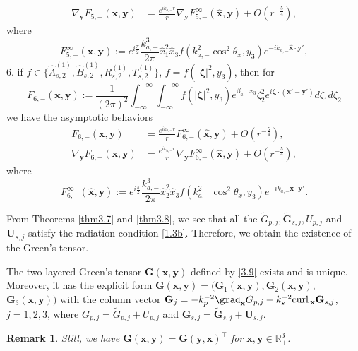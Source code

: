 \documentclass[final,reqno]{siamltex}
\newcommand{\curl}{{\rm curl\,}}
\newcommand{\wid}{\widetilde}
\newcommand{\mat}{\mathbb}
\newcommand{\R}{{\mat R}}
\newtheorem{remark}[theorem]{Remark}
\begin{document}
\begin{theorem}
\begin{align*}
	\nabla_{\mathbf{y}}F_{5,-}(\mathbf{x},\mathbf{y})&=\frac{e^{ik_{a,-}r}}{r}\nabla_{\mathbf{y}}F_{5,-}^\infty(\hat{\mathbf{x}},\mathbf{y})+O(r^{-\frac{5}{4}}), 
	\end{align*}
	where 
	$$
	F_{5,-}^\infty(\hat{\mathbf{x}},\mathbf{y}):=e^{i\frac{\pi}{2}}\frac{k_{a,-}^3}{2\pi}\hat x_1^2\hat x_3f(k_{a,-}^2\cos^2\theta_x,y_3)e^{-ik_{a,-}\hat{\mathbf{x}}\cdot\mathbf{y}'}, 
	$$
	6. if $f\in\{\hat A_{s,2}^{(1)},\hat B_{s,2}^{(1)},R_{s,2}^{(1)},T_{s,2}^{(1)}\}$, $f=f(|\boldsymbol{\zeta}|^2,y_3)$, then for 
	$$
	F_{6,-}(\mathbf{x},\mathbf{y}):=\frac{1}{(2\pi)^2}\int_{-\infty}^{+\infty}\int_{-\infty}^{+\infty}f(|\boldsymbol{\zeta}|^2,y_3)e^{\beta_{a,-}x_3}\zeta_2^2e^{i\boldsymbol{\zeta}\cdot(\mathbf{x}'-\mathbf{y}')}d\zeta_1d\zeta_2
	$$
	we have the asymptotic behaviors 
	\begin{align*}
	F_{6,-}(\mathbf{x},\mathbf{y})&=\frac{e^{ik_{a,-}r}}{r}F_{6,-}^\infty(\hat{\mathbf{x}},\mathbf{y})+O(r^{-\frac{5}{4}}), \\ 
	\nabla_{\mathbf{y}}F_{6,-}(\mathbf{x},\mathbf{y})&=\frac{e^{ik_{a,-}r}}{r}\nabla_{\mathbf{y}}F_{6,-}^\infty(\hat{\mathbf{x}},\mathbf{y})+O(r^{-\frac{5}{4}}), 
	\end{align*}
	where 
	$$
	F_{6,-}^\infty(\hat{\mathbf{x}},\mathbf{y}):=e^{i\frac{\pi}{2}}\frac{k_{a,-}^3}{2\pi}\hat x_2^2\hat x_3f(k_{a,-}^2\cos^2\theta_x,y_3)e^{-ik_{a,-}\hat{\mathbf{x}}\cdot\mathbf{y}'}. 
	$$
\end{theorem}

From Theorems \ref{thm3.7} and \ref{thm3.8}, we see that all the $\wid G_{p,j},\mathbf{\wid G}_{s,j},U_{p,j}$ and $\mathbf{U}_{s,j}$ satisfy the radiation condition \eqref{1.3b}. Therefore, we obtain the existence of the Green's tensor. 
\begin{theorem}\label{thm3.9}
	The two-layered Green's tensor $\mathbf{G}(\mathbf{x},\mathbf{y})$ defined by \eqref{3.9} exists and is unique. Moreover, it has the explicit form $\mathbf{G}(\mathbf{x},\mathbf{y})=(\mathbf{G}_1(\mathbf{x},\mathbf{y}),\mathbf{G}_2(\mathbf{x},\mathbf{y}),$ $\mathbf{G}_3(\mathbf{x},\mathbf{y}))$ with the column vector $\mathbf{G}_j=-k_p^{-2}\grad_{\mathbf{x}}G_{p,j}+k_s^{-2}\curl_{\mathbf{x}}\mathbf{G}_{s,j}$, $j=1,2,3$, where $G_{p,j}=\wid G_{p,j}+U_{p,j}$ and $\mathbf{G}_{s,j}=\mathbf{\wid G}_{s,j}+\mathbf{U}_{s,j}$. 
\end{theorem}
\begin{remark}\label{rem3.11}
	Still, we have $\mathbf{G}(\mathbf{x},\mathbf{y})=\mathbf{G}(\mathbf{y},\mathbf{x})^\top$ for $\mathbf{x},\mathbf{y}\in\R^3_\pm$. 
\end{remark}
\end{document}
